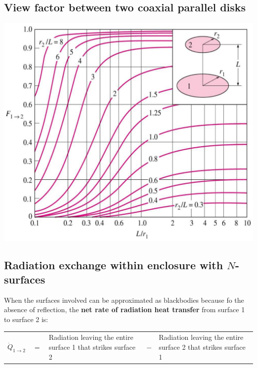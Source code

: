 \documentclass[11pt]{article}
\begin{document}
\subsection{View factor between two coaxial parallel disks}
\label{sec:org6e1619c}
\begin{center}
\includegraphics[width=.9\linewidth]{./images/view-factors-between-two-coaxial-parallel-disks-graph.png}
\end{center}

 \newpage

\subsection{Radiation exchange within enclosure with \(N\)-surfaces}
\label{sec:org5f8f88f}
When the surfaces involved can be approximated as blackbodies because fo the absence of reflection, the \textbf{net rate of radiation heat transfer} from surface 1 to surface 2 is:
\begin{center}
\begin{tabular}{>{\centering\arraybackslash}m{3em} >{\centering\arraybackslash}m{1em} >{\centering\arraybackslash}m{10em} >{\centering\arraybackslash}m{1em} >{\centering\arraybackslash}m{10em}}
\(\dot{Q}_{1 \rightarrow 2}\) & \(=\) & Radiation leaving the entire surface 1 that strikes surface 2 & \(-\) & Radiation leaving the entire surface 2 that strikes surface 1\\[0pt]
\end{tabular}
\end{center}
\end{document}
